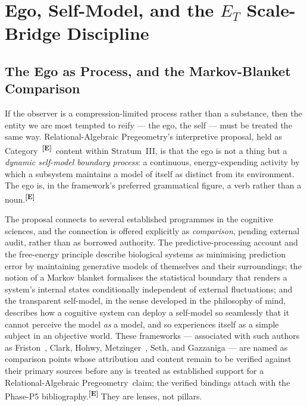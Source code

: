 \documentclass[12pt,a4paper,twoside]{article}
\theoremstyle{plain}
\theoremstyle{definition}
\theoremstyle{remark}
\newcommand{\ProjectShort}{Relational-Algebraic Pregeometry}
\newcommand{\RAP}{\ProjectShort}
\newcommand{\catmark}[1]{\textsuperscript{\textsf{\textbf{[#1]}}}}
\begin{document}
\section{Ego, Self-Model, and the \texorpdfstring{$E_T$}{E\_T} Scale-Bridge Discipline}
\label{sec:ego-selfmodel-et}

\subsection{The Ego as Process, and the Markov-Blanket Comparison}
\label{subsec:ego-as-process}

If the observer is a compression-limited process rather than a
substance, then the entity we are most tempted to reify --- the ego, the
self --- must be treated the same way. \RAP's interpretive proposal,
held as Category~\catmark{E}\ content within Stratum~III, is that the
ego is not a thing but a \emph{dynamic self-model boundary process}: a
continuous, energy-expending activity by which a subsystem maintains a
model of itself as distinct from its environment. The ego is, in the
framework's preferred grammatical figure, a verb rather than a
noun.\catmark{E}

The proposal connects to several established programmes in the cognitive
sciences, and the connection is offered explicitly as \emph{comparison},
pending external audit, rather than as borrowed authority. The
predictive-processing account and the free-energy principle describe
biological systems as minimising prediction error by maintaining
generative models of themselves and their surroundings; the notion of a
Markov blanket formalises the statistical boundary that renders a
system's internal states conditionally independent of external
fluctuations; and the transparent self-model, in the sense developed in
the philosophy of mind, describes how a cognitive system can deploy a
self-model so seamlessly that it cannot perceive the model \emph{as} a
model, and so experiences itself as a simple subject in an objective
world. These frameworks --- associated with such authors as Friston~\cite{friston2010},
Clark, Hohwy, Metzinger~\cite{metzinger2003}, Seth, and Gazzaniga --- are named as comparison
points whose attribution and content remain to be verified against their
primary sources before any is treated as established support for a
\RAP\ claim; the verified bindings attach with the Phase-P5
bibliography.\catmark{E} They are lenses, not pillars.
\end{document}
